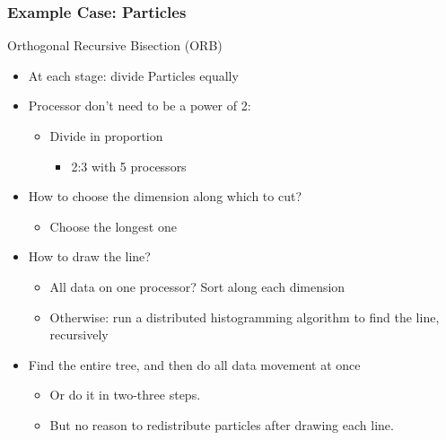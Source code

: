 \begin{frame}[fragile]
\frametitle{Example Case: Particles}
 Orthogonal Recursive Bisection (ORB)
 \begin{itemize} 
  \item At each stage: divide Particles equally
  \item Processor don’t need to be a power of 2:
  \begin{itemize} 
   \item Divide in proportion 
   \begin{itemize} 
    \item 2:3 with 5 processors
   \end{itemize}
  \end{itemize}
 \item How to choose the dimension along which to cut?
 \begin{itemize} 
  \item Choose the longest one
 \end{itemize}
 \item How to draw the line?
 \begin{itemize} 
  \item All data on one processor? Sort along each dimension
  \item Otherwise: run a distributed histogramming algorithm to find the line, recursively
 \end{itemize}
 \item Find the entire tree, and then do all data movement at once
 \begin{itemize} 
  \item Or do it in two-three steps.
  \item But no reason to redistribute particles after drawing each line.
 \end{itemize}
\end{itemize}
\end{frame}

